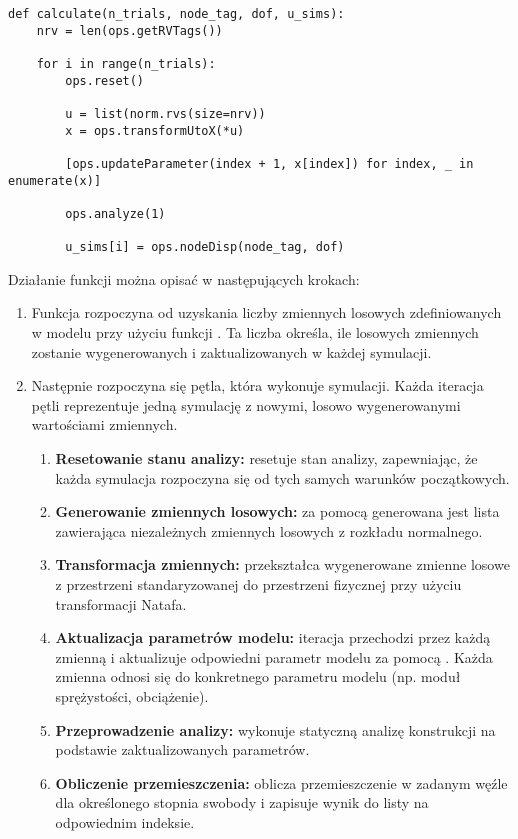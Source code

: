 \begin{lstlisting}
def calculate(n_trials, node_tag, dof, u_sims):
    nrv = len(ops.getRVTags())

    for i in range(n_trials):
        ops.reset()

        u = list(norm.rvs(size=nrv))
        x = ops.transformUtoX(*u)

        [ops.updateParameter(index + 1, x[index]) for index, _ in enumerate(x)]

        ops.analyze(1)

        u_sims[i] = ops.nodeDisp(node_tag, dof)
\end{lstlisting}
Działanie funkcji można opisać w następujących krokach:

\begin{enumerate}
    \item Funkcja rozpoczyna od uzyskania liczby zmiennych losowych  zdefiniowanych w modelu przy użyciu funkcji . Ta liczba określa, ile losowych zmiennych zostanie wygenerowanych i zaktualizowanych w każdej symulacji.
    \item Następnie rozpoczyna się pętla, która wykonuje  symulacji. Każda iteracja pętli reprezentuje jedną symulację z nowymi, losowo wygenerowanymi wartościami zmiennych.
    \begin{enumerate} [left=-12pt]
        \item \textbf{Resetowanie stanu analizy:}  resetuje stan analizy, zapewniając, że każda symulacja rozpoczyna się od tych samych warunków początkowych.
        \item \textbf{Generowanie zmiennych losowych:} za pomocą  generowana jest lista  zawierająca  niezależnych zmiennych losowych z rozkładu normalnego.
        \item \textbf{Transformacja zmiennych:}  przekształca wygenerowane zmienne losowe  z przestrzeni standaryzowanej do przestrzeni fizycznej  przy użyciu transformacji Natafa.
        \item \textbf{Aktualizacja parametrów modelu:} iteracja  przechodzi przez każdą zmienną  i aktualizuje odpowiedni parametr modelu za pomocą . Każda zmienna  odnosi się do konkretnego parametru modelu (np. moduł sprężystości, obciążenie).
        \item \textbf{Przeprowadzenie analizy:}  wykonuje statyczną analizę konstrukcji na podstawie zaktualizowanych parametrów.
        \item \textbf{Obliczenie przemieszczenia:}  oblicza przemieszczenie w zadanym węźle dla określonego stopnia swobody i zapisuje wynik do listy  na odpowiednim indeksie.
    \end{enumerate}
\end{enumerate}

